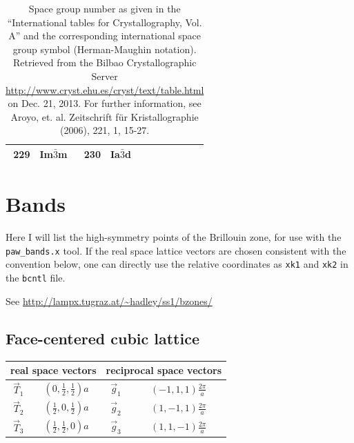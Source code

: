 \documentclass[final,12pt]{article}
\begin{document}
{{{{{{\begin{table}[!h]
\begin{center}
\begin{tabular}{||r|l||r|l||r|l||r|l||r|l||}
229    & Im$\bar{3}$m       & 
230    & Ia$\bar{3}$d       \\
\hline
\end{tabular}
\end{center}
\caption{\label{table:spacegroupnumber_b}Space group number as given
  in the ``International tables for Crystallography, Vol. A'' and the
  corresponding international space group symbol (Herman-Maughin
  notation). Retrieved from the Bilbao Crystallographic Server
  \url{http://www.cryst.ehu.es/cryst/text/table.html} on Dec. 21,
  2013.  For further information, see Aroyo, et. al. Zeitschrift f\"ur
  Kristallographie (2006), 221, 1, 15-27.  }
\end{table}


\newpage
\section{Bands}
Here I will list the high-symmetry points of the Brillouin zone, for
use with the \verb|paw_bands.x| tool. If the real space lattice vectors are
chosen consistent with the convention below, one can directly use the
relative coordinates as \verb|xk1| and \verb|xk2| in the \verb|bcntl|
file.

See \url{http://lampx.tugraz.at/~hadley/ss1/bzones/}

\subsection{Face-centered cubic lattice}
\begin{center}
\renewcommand\arraystretch{1.5}
\begin{tabular}{||c|c||c|c||}
\hline
\multicolumn{2}{|c|}{real space vectors} &
\multicolumn{2}{|c|}{reciprocal space vectors} \\
\hline
$\vec{T}_1$ & $(0,\frac{1}{2},\frac{1}{2}) a$ &
$\vec{g}_1$ & $(-1,1,1)\frac{2\pi}{a}$ \\
$\vec{T}_2$ & $(\frac{1}{2},0,\frac{1}{2}) a$ &
$\vec{g}_2$ & $(1,-1,1)\frac{2\pi}{a}$ \\
$\vec{T}_3$ & $(\frac{1}{2},\frac{1}{2},0) a$ &
$\vec{g}_3$ & $(1,1,-1)\frac{2\pi}{a}$ \\
\hline
\end{tabular}
\renewcommand\arraystretch{1.}
\end{center}

}}}}}}
\end{document}
